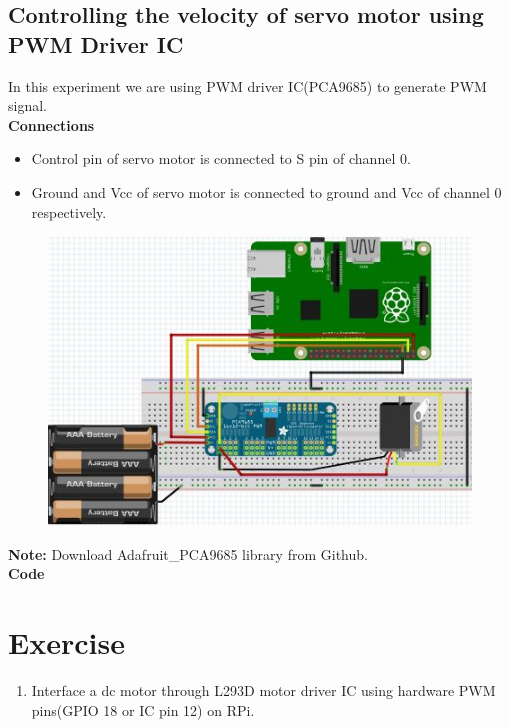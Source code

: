 \documentclass[11pt,a4paper]{article}
\begin{document}
	\subsection{Controlling the velocity of servo motor using PWM Driver IC} 
	In this experiment we are using PWM driver IC(PCA9685) to generate PWM signal. \\
	\textbf{Connections}\\
	\begin{itemize}
		\item Control pin of servo motor is connected to S pin of channel 0.
		\item Ground and Vcc of servo motor is connected to ground and Vcc of channel 0 respectively.
	\end{itemize} 
	\begin{figure}[h!]
		\includegraphics[scale=0.6]{servo_motor_PCA9685.jpg}
		\centering
	\end{figure}
	\vspace{5mm}

	\textbf{Note:} Download Adafruit\_PCA9685 library from Github.\\
	\textbf{Code}
	\vspace{0.3cm}
	
		
	\section{Exercise}
	\begin{enumerate}
			\item Interface a dc motor through L293D motor driver IC using hardware PWM pins(GPIO 18 or IC pin 12) on RPi.
	\end{enumerate}
	
\end{document}
